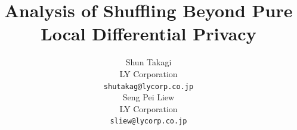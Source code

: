 \documentclass{article}
\theoremstyle{plain}
\theoremstyle{definition}
\begin{document}
\title{Analysis of Shuffling Beyond Pure Local Differential Privacy}




\author{%
  Shun Takagi \\
  LY Corporation \\
  \texttt{shutakag@lycorp.co.jp} \\
  \And
  Seng Pei Liew \\
  LY Corporation \\
  \texttt{sliew@lycorp.co.jp} \\
}
\maketitle
\end{document}

